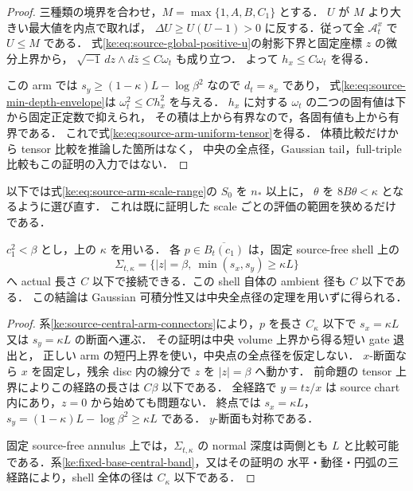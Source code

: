 \begin{proof}
三種類の境界を合わせ，$M=\max\{1,A,B,C_1\}$ とする．
$U$ が $M$ より大きい最大値を内点で取れば，
$\Delta U\ge U(U-1)>0$ に反する．従って全 $\mathcal A^x_t$ で $U\le M$ である．
式\eqref{ke:eq:source-global-positive-u}の射影下界と固定座標 $z$ の微分上界から，
$\sqrt{-1}\,dz\wedge d\bar z\le C\omega_t$ も成り立つ．
よって $h_x\le C\omega_t$ を得る．

この arm では $s_y\ge(1-\kappa)L-\log\beta^2$ なので $d_t=s_x$ であり，
式\eqref{ke:eq:source-min-depth-envelope}は $\omega_t^2\le C h_x^2$ を与える．
$h_x$ に対する $\omega_t$ の二つの固有値は下から固定正定数で抑えられ，
その積は上から有界なので，各固有値も上から有界である．
これで式\eqref{ke:eq:source-arm-uniform-tensor}を得る．
体積比較だけから tensor 比較を推論した箇所はなく，
中央の全点径，Gaussian tail，full-triple 比較もこの証明の入力ではない．
\end{proof}

以下では式\eqref{ke:eq:source-arm-scale-range}の $S_0$ を $n_*$ 以上に，
$\theta$ を $8B\theta<\kappa$ となるように選び直す．
これは既に証明した scale ごとの評価の範囲を狭めるだけである．

\begin{lemma}[中央点からの直接の有界退出]
\label{ke:source-direct-central-exit}
$c_1^2<\beta$ とし，上の $\kappa$ を用いる．
各 $p\in\overline{B_t(c_1)}$ は，固定 source-free shell 上の
\[
 \Sigma_{t,\kappa}
 =\{|z|=\beta,\ \min(s_x,s_y)\ge\kappa L\}
\]
へ actual 長さ $C$ 以下で接続できる．この shell 自体の ambient 径も $C$ 以下である．
この結論は Gaussian 可積分性又は中央全点径の定理を用いずに得られる．
\end{lemma}

\begin{proof}
系\ref{ke:source-central-arm-connectors}により，$p$ を長さ $C_\kappa$ 以下で
$s_x=\kappa L$ 又は $s_y=\kappa L$ の断面へ運ぶ．
その証明は中央 volume 上界から得る短い gate 退出と，
正しい arm の短円上界を使い，中央点の全点径を仮定しない．
$x$-断面なら $x$ を固定し，残余 disc 内の線分で $z$ を $|z|=\beta$ へ動かす．
前命題の tensor 上界によりこの経路の長さは $C\beta$ 以下である．
全経路で $y=tz/x$ は source chart 内にあり，$z=0$ から始めても問題ない．
終点では $s_x=\kappa L$，$s_y=(1-\kappa)L-\log\beta^2\ge\kappa L$ である．
$y$-断面も対称である．

固定 source-free annulus 上では，$\Sigma_{t,\kappa}$ の normal 深度は両側とも
$L$ と比較可能である．系\ref{ke:fixed-base-central-band}，又はその証明の
水平・動径・円弧の三経路により，shell 全体の径は $C_\kappa$ 以下である．
\end{proof}


